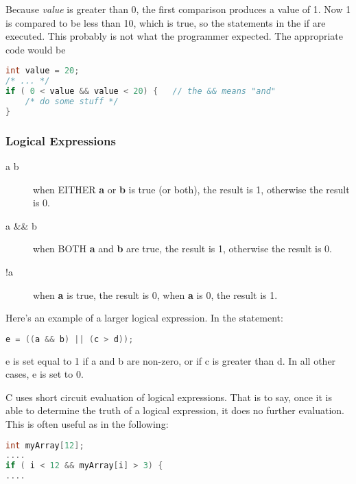 Because \emph{value} is greater than 0, the first comparison produces a value
of 1. Now 1 is compared to be less than 10, which is true, so the statements in
the if are executed. This probably is not what the programmer expected. The
appropriate code would be
\lstset{basicstyle=\scriptsize, numbers=left, captionpos=b, tabsize=4}
\begin{lstlisting}[caption=Section \thesection listing \arabic{controlcnt},language={C},
breaklines=true,xleftmargin=15pt, label=lst:section\thesection listing\arabic{controlcnt}]
int value = 20;
/* ... */
if ( 0 < value && value < 20) {   // the && means "and"
	/* do some stuff */
}
\end{lstlisting}

\subsubsection{Logical Expressions}
\begin{description}
	\item[a \textbar{}\textbar{} b] when EITHER \textbf{a} or \textbf{b} is true (or both), the result is 1, otherwise the result is 0.
	\item[a \&\& b] when BOTH \textbf{a} and \textbf{b} are true, the result is 1, otherwise the result is 0.
	\item[!a] when \textbf{a} is true, the result is 0, when \textbf{a} is 0, the result is 1.
\end{description}

Here's an example of a larger logical expression. In the statement:
\lstset{basicstyle=\scriptsize, numbers=left, captionpos=b, tabsize=4}
\begin{lstlisting}[caption=Section \thesection listing \arabic{controlcnt},language={C},
breaklines=true,xleftmargin=15pt, label=lst:section\thesection listing\arabic{controlcnt}]
e = ((a && b) || (c > d));
\end{lstlisting}
e is set equal to 1 if a and b are non-zero, or if c is greater than d. In all
other cases, e is set to 0.

C uses short circuit evaluation of logical expressions. That is to say, once it
is able to determine the truth of a logical expression, it does no further
evaluation. This is often useful as in the following:
\lstset{basicstyle=\scriptsize, numbers=left, captionpos=b, tabsize=4}
\begin{lstlisting}[caption=Section \thesection listing \arabic{controlcnt},language={C},
breaklines=true,xleftmargin=15pt, label=lst:section\thesection listing\arabic{controlcnt}]
int myArray[12];
....
if ( i < 12 && myArray[i] > 3) { 
....
\end{lstlisting}


